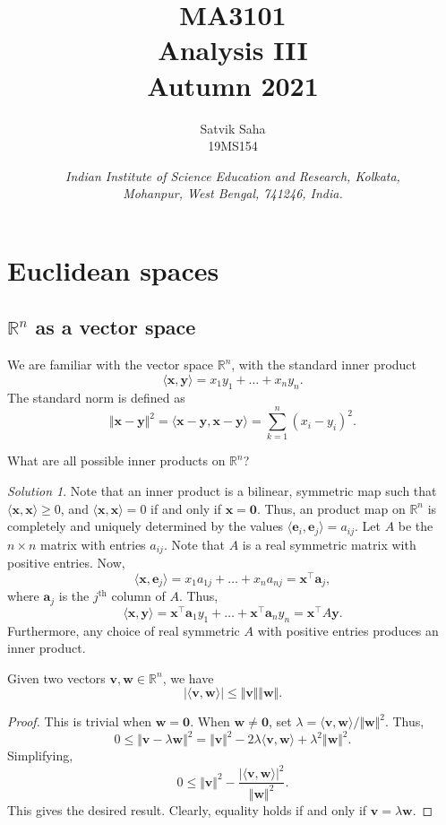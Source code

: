 \documentclass[11pt]{article}
\title{
    \Large\textsc{MA3101} \\
    \Huge \textbf{Analysis III} \\
    \vspace{5pt}
    \Large{Autumn 2021}
}
\author{
    \large Satvik Saha
    \\\textsc{\small 19MS154}
}
\date{\normalsize
    \textit{Indian Institute of Science Education and Research, Kolkata, \\
    Mohanpur, West Bengal, 741246, India.} \\
}
\newcommand{\R}{\mathbb{R}}
\newcommand{\ip}[2]{\langle #1, #2 \rangle}
\newcommand{\norm}[1]{\Vert #1 \Vert}
\renewcommand{\vec}[1]{\boldsymbol{#1}}
\newcommand{\vx}{\vec{x}}
\newcommand{\vy}{\vec{y}}
\newcommand{\vv}{\vec{v}}
\newcommand{\vw}{\vec{w}}
\newcommand{\ve}{\vec{e}}
\theoremstyle{definition}
\theoremstyle{remark}
\newtheorem*{solution}{Solution}
\numberwithin{equation}{section}
\begin{document}
    \maketitle

    \tableofcontents

    \section{Euclidean spaces}

    \subsection{$\R^n$ as a vector space}
    
    We are familiar with the vector space $\R^n$, with the standard inner product \[
        \ip{\vx}{\vy} = x_1y_1 + \dots + x_ny_n.
    \] The standard norm is defined as \[
        \norm{\vx - \vy}^2 = \ip{\vx - \vy}{\vx - \vy} = \sum_{k = 1}^n (x_i -
        y_i)^2.
    \]

    \begin{exercise}
        What are all possible inner products on $\R^n$?
        \begin{solution}
            Note that an inner product is a bilinear, symmetric map such that
            $\ip{\vx}{\vx} \geq 0$, and $\ip{\vx}{\vx} = 0$ if and only if $\vx =
            \vec{0}$. Thus, an product map on $\R^n$ is completely and uniquely
            determined by the values $\ip{\ve_i}{\ve_j} = a_{ij}$. Let $A$ be the
            $n \times n$ matrix with entries $a_{ij}$. Note that $A$ is a real
            symmetric matrix with positive entries. Now, \[
                \ip{\vx}{\ve_j} = x_1a_{1j} + \dots + x_na_{nj} = \vx^\top \vec{a}_j,
            \] where $\vec{a}_j$ is the $j^\text{th}$ column of $A$. Thus, \[
                \ip{\vx}{\vy} = \vx^\top \vec{a}_1 y_1 + \dots + \vx^\top
                \vec{a}_n y_n = \vx^\top A \vy.
            \] Furthermore, any choice of real symmetric $A$ with positive
            entries produces an inner product.
        \end{solution}
    \end{exercise}

    \begin{theorem}
        Given two vectors $\vv, \vw \in \R^n$, we have \[
            |\ip{\vv}{\vw}| \leq \norm{\vv}\norm{\vw}.
        \] 
    \end{theorem}
    \begin{proof}
        This is trivial when $\vw = \vec{0}$. When $\vw \neq \vec{0}$, set $\lambda =
        \ip{\vv}{\vw} / \norm{\vw}^2$. Thus, \[
            0 \leq \norm{\vv - \lambda \vw}^2 = \norm{\vv}^2 - 2\lambda \ip{\vv}{\vw}
            + \lambda^2\norm{\vw}^2.
        \] Simplifying, \[
            0 \leq \norm{\vv}^2 - \frac{|\ip{\vv}{\vw}|^2}{\norm{\vw}^2}.
        \] This gives the desired result. Clearly, equality holds if and only if $\vv
        = \lambda \vw$.
    \end{proof}
    
\end{document}
